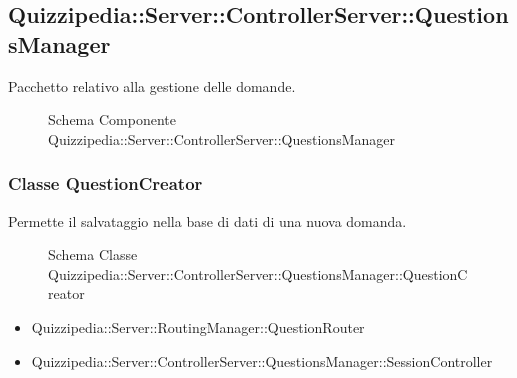 \subsection{Quizzipedia::Server::ControllerServer::QuestionsManager}
Pacchetto relativo alla gestione delle domande.
\begin{figure}[H]
\centering
\noindent{}
\caption[Schema Componente Quizzipedia::Server::ControllerServer::QuestionsManager]{Schema Componente Quizzipedia::Server::ControllerServer::QuestionsManager}
\end{figure}
\subsubsection{Classe QuestionCreator}
Permette il salvataggio nella base di dati di una nuova domanda.
\begin{figure}[H]
\centering
\noindent{}
\caption[Schema Classe QuestionCreator]{Schema Classe Quizzipedia::Server::ControllerServer::QuestionsManager::QuestionCreator}
\end{figure}
\begin{itemize}
\item Quizzipedia::Server::RoutingManager::QuestionRouter
\end{itemize}
\begin{itemize}
\item Quizzipedia::Server::ControllerServer::QuestionsManager::SessionController
\end{itemize}

